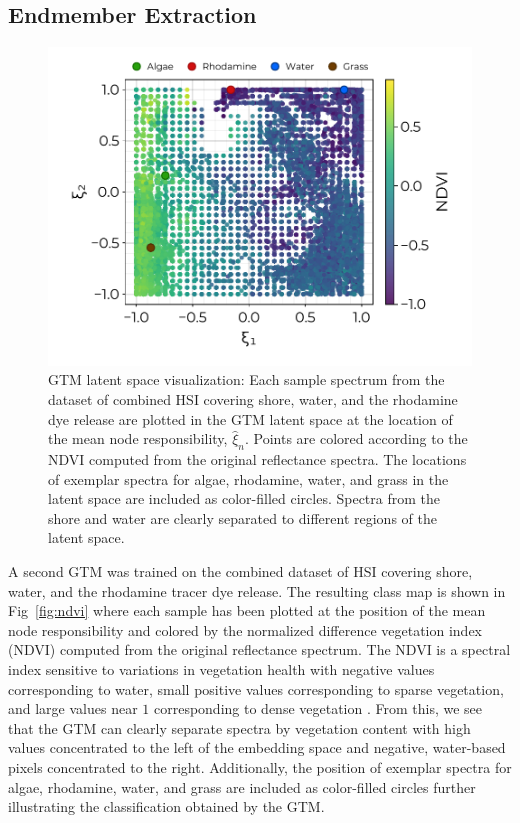 \documentclass[remotesensing,article,submit,pdftex,moreauthors]{Definitions/mdpi}
\begin{document}
\subsection{Endmember Extraction}

\begin{figure}[t]
\centering
\includegraphics[width=0.8\columnwidth]{paper/figures/results/square-ndvi.pdf}
\caption{GTM latent space visualization: Each sample spectrum from the dataset of combined HSI covering shore, water, and the rhodamine dye release are plotted in the GTM latent space at the location of the mean node responsibility, $\hat{\xi}_n$. Points are colored according to the NDVI computed from the original reflectance spectra. The locations of exemplar spectra for algae, rhodamine, water, and grass in the latent space are included as color-filled circles. Spectra from the shore and water are clearly separated to different regions of the latent space.\label{fig:gtm-ndvi}}
\end{figure}  

A second GTM was trained on the combined dataset of HSI covering shore, water, and the rhodamine tracer dye release. The resulting class map is shown in Fig~\ref{fig:ndvi} where each sample has been plotted at the position of the mean node responsibility and colored by the normalized difference vegetation index (NDVI) computed from the original reflectance spectrum. The NDVI is a spectral index sensitive to variations in vegetation health with negative values corresponding to water, small positive values corresponding to sparse vegetation, and large values near $1$ corresponding to dense vegetation \cite{thenkabail2018hyperspectral}. From this, we see that the GTM can clearly separate spectra by vegetation content with high values concentrated to the left of the embedding space and negative, water-based pixels concentrated to the right. Additionally, the position of exemplar spectra for algae, rhodamine, water, and grass are included as color-filled circles further illustrating the classification obtained by the GTM.
\end{document}
